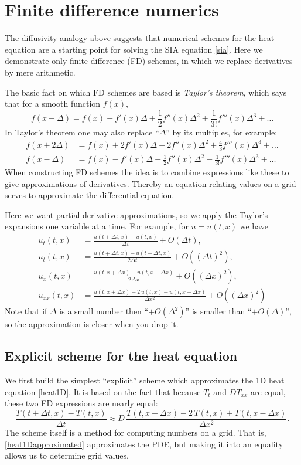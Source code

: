 \documentclass[letterpaper,final,12pt,reqno]{amsart}
\begin{document}
\section{Finite difference numerics}  \label{sec:fd}

The diffusivity analogy above suggests that numerical schemes for the heat equation are a starting point for solving the SIA equation \eqref{sia}.  Here we demonstrate only finite difference (FD) schemes, in which we replace derivatives by mere arithmetic.

The basic fact on which FD schemes are based is \emph{Taylor's theorem}, which says that for a smooth function $f(x)$,
	$$f(x+\Delta) = f(x) + f'(x) \Delta + \frac{1}{2} f''(x) \Delta^2 + \frac{1}{3!} f'''(x) \Delta^3 + \dots$$
In Taylor's theorem one may also replace ``$\Delta$'' by its multiples, for example:
\begin{align*}
f(x+2\Delta) &= f(x) + 2 f'(x) \Delta + 2 f''(x) \Delta^2 + \frac{4}{3} f'''(x) \Delta^3 + \dots \\
f(x-\Delta) &= f(x) - f'(x) \Delta + \frac{1}{2} f''(x) \Delta^2 - \frac{1}{3!} f'''(x) \Delta^3 + \dots
\end{align*}
When constructing FD schemes the idea is to combine expressions like these to give approximations of derivatives.  Thereby an equation relating values on a grid serves to approximate the differential equation.

Here we want partial derivative approximations, so we apply the Taylor's expansions one variable at a time.  For example, for $u=u(t,x)$ we have
\begin{align*}
u_t(t,x) &= \frac{u(t+\Delta t,x) - u(t,x)}{\Delta t} + O(\Delta t), \\
u_t(t,x) &= \frac{u(t+\Delta t,x) - u(t-\Delta t,x)}{2\Delta t} + O((\Delta t)^2), \\
u_x(t,x) &= \frac{u(t,x+\Delta x) - u(t,x-\Delta x)}{2\Delta x} + O((\Delta x)^2), \\
u_{xx}(t,x) &= \frac{u(t,x+\Delta x) - 2\, u(t,x) + u(t,x-\Delta x)}{\Delta x^2} + O((\Delta x)^2)
\end{align*}
Note that if $\Delta$ is a small number then ``$+O(\Delta^2)$'' is smaller than ``$+O(\Delta)$'', so the approximation is closer when you drop it.

\subsection*{Explicit scheme for the heat equation}  We first build the simplest ``explicit'' scheme which approximates the 1D heat equation \eqref{heat1D}.  It is based on the fact that because $T_t$ and $D T_{xx}$ are equal, these two FD expressions are nearly equal:
\begin{equation}
\frac{T(t+\Delta t,x) - T(t,x)}{\Delta t} \approx D\,\frac{T(t,x+\Delta x) - 2\, T(t,x) + T(t,x-\Delta x)}{\Delta x^2}.  \label{heat1Dapproximated}
\end{equation}
The scheme itself is a method for computing numbers on a grid.  That is, \eqref{heat1Dapproximated} approximates the PDE, but making it into an equality allows us to determine grid values.
\end{document}
